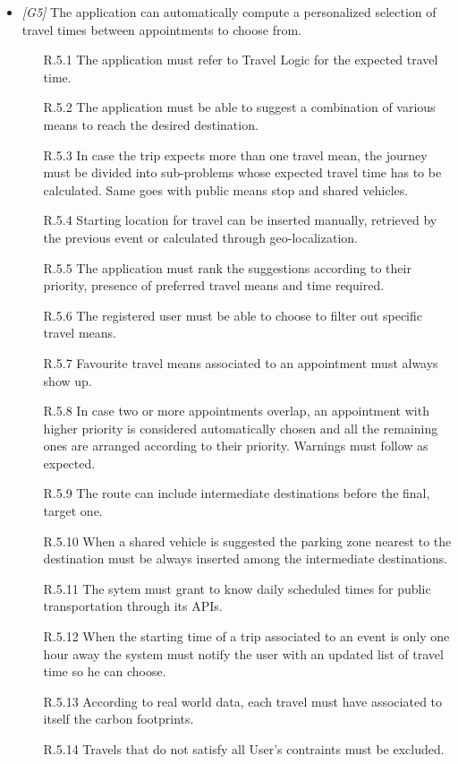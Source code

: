\begin{itemize}
	\item \textit{[G5]} The application can automatically compute a personalized selection of travel times between appointments to choose from.
		\begin{itemize}
			\item [R.5.1] The application must refer to Travel Logic for the expected travel time.
			\item [R.5.2] The application must be able to suggest a combination of various means to reach the desired destination.
			\item [R.5.3] In case the trip expects more than one travel mean, the journey must be divided into sub-problems whose expected travel time has to be calculated. Same goes with public means stop and shared vehicles.
			\item [R.5.4] Starting location for travel can be inserted manually, retrieved by the previous event or calculated through geo-localization.
			\item [R.5.5] The application must rank the suggestions according to their priority, presence of preferred travel means and time required.
			\item [R.5.6] The registered user must be able to choose to filter out specific travel means.
			\item [R.5.7] Favourite travel means associated to an appointment must always show up.
			\item [R.5.8] In case two or more appointments overlap, an appointment with higher priority is considered automatically chosen and all the remaining ones are arranged according to their priority. Warnings must follow as expected.
			\item [R.5.9] The route can include intermediate destinations before the final, target one.
			\item [R.5.10] When a shared vehicle is suggested the parking zone nearest to the destination must be always inserted among the intermediate destinations.
			\item [R.5.11] The sytem must grant to know daily scheduled times for public transportation through its APIs.
			\item [R.5.12] When the starting time of a trip associated to an event is only one hour away the system must notify the user with an updated list of travel time so he can choose.
			\item [R.5.13] According to real world data, each travel must have associated to itself the carbon footprints.
			\item [R.5.14] Travels that do not satisfy all User's contraints must be excluded.
			

\end{itemize}
\end{itemize}
